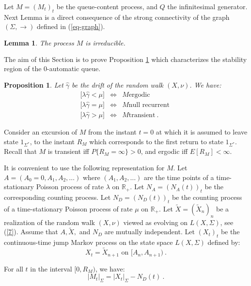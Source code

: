 \documentclass[11pt,a4paper]{article}
\newtheorem{proposition}[theorem]{Proposition}
\newtheorem{lemma}[theorem]{Lemma}
\theoremstyle{remark}
\def\Blackboardfont{\mathbb}
\def\R{{\Blackboardfont R}}
\def\iff{\Longleftrightarrow}
\def\eref#1{(\ref{#1})}
\begin{document}
\medskip

Let $M=(M_t)_t$ be the queue-content process, and $Q$ the
infinitesimal generator. Next Lemma is a direct consequence of the
strong connectivity of the graph $(\Sigma,\rightarrow)$ defined in
\eref{eq-graph}. 

\begin{lemma}
The process $M$ is irreducible.
\end{lemma}

The aim of this Section is to prove Proposition
\ref{pr-stability} which characterizes the stability region of the 0-automatic
queue.

\begin{proposition}\label{pr-stability}
Let
$\widehat{\gamma}$ be the drift of the random walk $(X,\nu)$.
We have:
\begin{eqnarray*}
 \bigl[ \lambda \widehat{\gamma} <\mu \bigr] & \iff & M \text{
   ergodic } \\
\bigl[ \lambda \widehat{\gamma} =\mu \bigr] & \iff & M \text{
   null recurrent } \\
\bigl[ \lambda \widehat{\gamma} > \mu \bigr] & \iff & M \text{
   transient} \:.
\end{eqnarray*}
\end{proposition}

Consider an excursion of $M$ from the instant $t=0$ at which it is
assumed to leave state $1_{\Sigma^*}$, to the instant $R_M$ which corresponds to
the first return to state $1_{\Sigma^*}$. Recall that $M$ is transient iff
$P\{R_M=\infty\}>0$, and ergodic iff $E[R_M]<\infty$.

It is convenient to
use the following representation for $M$.
Let $A=(A_0=0,A_1,A_2,\dots)$ where $(A_1,A_2,\dots )$ are the time
points of a time-stationary 
Poisson process of rate $\lambda$ on $\R_+$. Let $N_A =
(N_A(t))_t$ be the corresponding counting process. Let $N_D=
(N_D(t))_t$ be the counting process of a time-stationary Poisson
process of rate $\mu$ on $\R_+$.
Let $\widetilde{X}= (\widetilde{X}_n )_n$ be a realization of the
random walk $(X,\nu)$ viewed as evolving on $L(X,\Sigma)$, see
\eref{7}. Assume that $A,\widetilde{X},$ and $N_D$ are mutually
independent. Let $(X_t)_t$ be the continuous-time jump Markov
process on the state space $L(X,\Sigma)$ defined by:
\[
X_t = \widetilde{X}_{n+1} \text{ on } [A_n,A_{n+1}) \:.
\]

For all $t$ in the interval $[0,R_M)$, we have:
\begin{equation}\label{eq-repr}
|M_t|_{\Sigma} = |X_t|_{\Sigma} - N_D(t) \:.
\end{equation}
\end{document}
